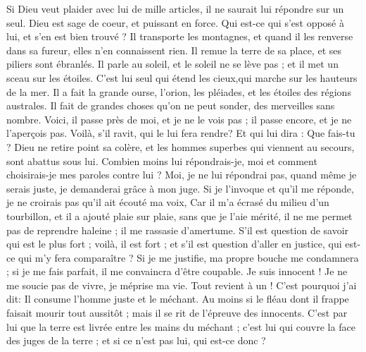 \begin{multicols}{2}
Si Dieu veut plaider avec lui de mille articles, il ne saurait lui répondre sur un seul.
 Dieu est sage de coeur, et puissant en force. Qui est-ce qui s'est opposé à lui, et s'en est bien trouvé ?
Il transporte les montagnes, et quand il les renverse dans sa fureur, elles n'en connaissent rien.
Il remue la terre de sa place, et ses piliers sont ébranlés.
Il parle au soleil, et le soleil ne se lève pas ; et il met un sceau sur les étoiles.
 C'est lui seul qui étend les cieux,qui marche sur les hauteurs de la mer.
Il a fait la grande ourse, l'orion, les pléiades, et les étoiles des régions australes.
Il fait de grandes choses qu'on ne peut sonder, des merveilles sans nombre.
Voici, il passe près de moi, et je ne le vois pas ; il passe encore, et je ne l'aperçois pas.
Voilà, s'il ravit, qui le lui fera rendre? Et qui lui dira : Que fais-tu ?
Dieu ne retire point sa colère, et les hommes superbes qui viennent au secours, sont abattus sous lui.
Combien moins lui répondrais-je, moi et comment choisirais-je mes paroles contre lui ? 
Moi, je ne lui répondrai pas, quand même je serais juste, je demanderai grâce à mon juge.
Si je l'invoque et qu'il me réponde, je ne croirais pas qu'il ait écouté ma voix,
Car il m'a écrasé du milieu d'un tourbillon, et il a ajouté plaie sur plaie, sans que je l'aie mérité, 
il ne me permet pas de reprendre haleine ; il me rassasie d'amertume.
S'il est question de savoir qui est le plus fort ; voilà, il est fort ; et s'il est question d'aller en justice, qui est-ce qui m'y fera comparaître ? 
Si je me justifie, ma propre bouche me condamnera ; si je me fais parfait, il me convaincra d'être coupable.
Je suis innocent ! Je ne me soucie pas de vivre, je méprise ma vie.
Tout revient à un ! C'est pourquoi j'ai dit: Il consume l'homme juste et  le méchant.
Au moins si le fléau dont il frappe faisait mourir tout aussitôt ; mais il se rit de l'épreuve des innocents. 
C'est par lui que la terre est livrée entre les mains du méchant ; c'est lui qui couvre la face des juges de la terre ; et si ce n'est pas lui, qui est-ce donc ? 

\end{multicols}
